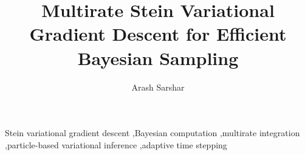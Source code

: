 \documentclass[preprint,12pt,review]{elsarticle}
\theoremstyle{remark}
\newif\ifblindsubmission
\begin{document}
\begin{frontmatter}

\title{Multirate Stein Variational Gradient Descent for Efficient Bayesian Sampling}

\ifblindsubmission
\author{Anonymous Author(s)}
\address{Anonymous Institution}
\else
\author[inst1]{Arash Sarshar}
\address[inst1]{Department of Computer Engineering and Computer Science, California State University, Long Beach, 90840, CA, USA}
\fi

\begin{abstract}

\end{abstract}

\begin{keyword}
Stein variational gradient descent \sep Bayesian computation \sep multirate integration \sep particle-based variational inference  \sep adaptive time stepping
\end{keyword}

\end{frontmatter}
\linenumbers







\ifblindsubmission
\else

\fi



\end{document}
